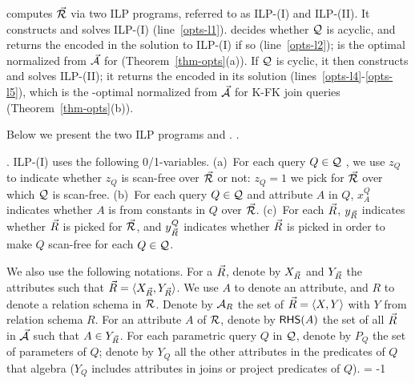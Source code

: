 \vspace{0.6ex}

\vspace{0.6ex}
computes $\vec{{\mathcal R}}$ via two ILP programs,
referred to as ILP-(I) and ILP-(II).
It constructs and solves ILP-(I) (line~\ref{opts-l1}).
 decides whether $\mathcal Q$ is acyclic,
and returns the \bds encoded in the solution to ILP-(I) if so
(line~\ref{opts-l2});  is the optimal normalized \bds from
$\vec{{\mathcal A}}$ for 
(Theorem~\ref{thm-opts}(a)). 
If $\mathcal Q$ is cyclic, it then constructs and
solves ILP-(II); it returns the \bds encoded in its solution
(lines~\ref{opts-l4}-\ref{opts-l5}), which
is the \ssf-optimal
normalized \bds from $\vec{{\mathcal A}}$ for K-FK join \SPC queries
(Theorem~\ref{thm-opts}(b)).


\vspace{0.8ex}
Below we present the two ILP programs and . .


. 
ILP-(I) uses the following 0/1-variables. 
(a)~For each query $Q\in \mathcal Q$ , we use $z_{Q}$ to indicate whether
$z_{Q}$ is scan-free over $\vec{{\mathcal R}}$ or not:
$z_{Q} = 1$  we pick \bss for $\vec{{\mathcal R}}$ over which $\mathcal Q$ is scan-free.
(b)~For each query $Q\in \mathcal Q$ and attribute $A$ in $Q$, 
$x_{A}^{Q}$ indicates whether $A$ is 
from constants
in $Q$ over $\vec{{\mathcal R}}$. 
(c)~For each \bs $\vec{R}$, $y_{\vec{R}}$ indicates
whether $\vec{R}$ is picked for $\vec{{\mathcal R}}$, and $y^{Q}_{\vec{R}}$ 
indicates whether $\vec{R}$ is picked in order to make $Q$ scan-free
for each $Q\in \mathcal Q$.

\vspace{0.36ex}
We also use the following notations. For a \bs $\vec{R}$,
denote by $X_{\vec{R}}$ and $Y_{\vec{R}}$ the attributes such that
$\vec{R}\allowbreak =\allowbreak  \langle X_{\vec{R}},\allowbreak Y_{\vec{R}}\rangle$.
We use $A$ to denote an attribute, and $R$ to denote a
relation schema in ${\mathcal R}$.
Denote by ${\mathcal A}_{R}$ the set of \bss $\vec{R} \allowbreak = \allowbreak
\langle X,\allowbreak Y\rangle$ with $Y$ from relation schema $R$. For an
attribute $A$ of ${\mathcal R}$, denote by ${\mathsf{RHS}}(A)$ the set of all \bss
$\vec{R}$ in $\vec{{\mathcal A}}$ such that $A\in Y_{\vec{R}}$.
%
For each parametric query $Q$ in $\mathcal Q$, denote by $P_{Q}$ the set
of parameters of $Q$; denote by $Y_{Q}$ all the other
attributes  %
in the predicates of $Q$ that
algebra (\ie $Y_{Q}$ includes attributes  %
in joins or project predicates of $Q$). 
\looseness = -1

